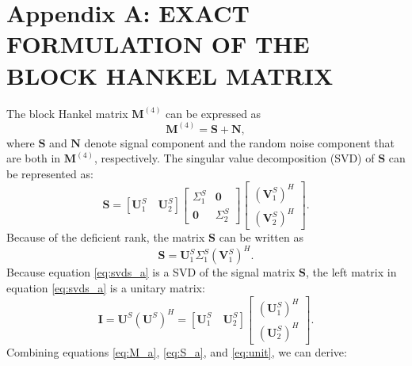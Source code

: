 \newpage
\appendix
\section{Appendix A: EXACT FORMULATION OF THE BLOCK HANKEL MATRIX}
The block Hankel matrix $\mathbf{M}^{(4)}$ can be expressed as
\begin{equation}
\label{eq:M_a}
\mathbf{M}^{(4)}=\mathbf{S}+\mathbf{N},
\end{equation}
where $\mathbf{S}$ and $\mathbf{N}$ denote signal component and the random noise component that are both in $\mathbf{M}^{(4)}$, respectively. The singular value decomposition (SVD) of $\mathbf{S}$ can be represented as:
\begin{equation}
\label{eq:svds_a}
\mathbf{S} = [\mathbf{U}_1^{S}\quad \mathbf{U}_2^{S}]\left[\begin{array}{cc}
\Sigma_1^{S} & \mathbf{0}\\
\mathbf{0} & \Sigma_2^{S}
\end{array}
\right]\left[\begin{array}{c}
(\mathbf{V}_1^{S})^H\\
(\mathbf{V}_2^{S})^H
\end{array}
\right].
\end{equation}
Because of the deficient rank, the matrix $\mathbf{S}$ can be written as
\begin{equation}
\label{eq:S_a}
\mathbf{S}=\mathbf{U}_1^S\Sigma_1^S(\mathbf{V}_1^S)^H.
\end{equation}
Because equation \ref{eq:svds_a} is a SVD of the signal matrix $\mathbf{S}$, the left matrix in equation \ref{eq:svds_a} is a unitary matrix:
\begin{equation}
\label{eq:unit}
\mathbf{I}=\mathbf{U}^S(\mathbf{U}^S)^H=[\mathbf{U}_1^S\quad \mathbf{U}_2^S]\left[\begin{array}{c} 
(\mathbf{U}_1^S)^H \\
(\mathbf{U}_2^S)^H 
\end{array}
\right].
\end{equation}
Combining equations \ref{eq:M_a}, \ref{eq:S_a}, and \ref{eq:unit}, we can derive:

